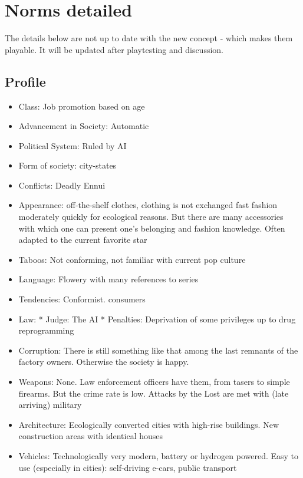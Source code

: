 \chapter {Norms detailed}


\begin{warning}
    The details below are not up to date with the new concept - which makes them playable. It will be updated after playtesting and discussion.
\end{warning}

\section{Profile}

\begin{itemize}
    \item Class: Job promotion based on age
    \item Advancement in Society: Automatic
    \item Political System: Ruled by AI
    \item Form of society: city-states
    \item Conflicts: Deadly Ennui
    \item Appearance: off-the-shelf clothes, clothing is not exchanged fast fashion moderately quickly for ecological reasons. But there are many accessories with which one can present one's belonging and fashion knowledge. Often adapted to the current favorite star
    \item Taboos: Not conforming, not familiar with current pop culture
    \item Language: Flowery with many references to series
    \item Tendencies: Conformist. consumers
    \item Law: * Judge: The AI * Penalties: Deprivation of some privileges up to drug reprogramming
    \item Corruption: There is still something like that among the last remnants of the factory owners. Otherwise the society is happy.
    \item Weapons: None. Law enforcement officers have them, from tasers to simple firearms. But the crime rate is low. Attacks by the Lost are met with (late arriving) military
    \item Architecture: Ecologically converted cities with high-rise buildings. New construction areas with identical houses
    \item Vehicles: Technologically very modern, battery or hydrogen powered. Easy to use (especially in cities): self-driving e-cars, public transport

\end{itemize}
